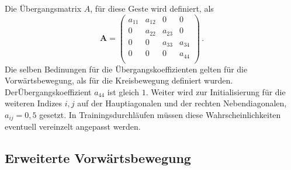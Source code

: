 Die \"Ubergangsmatrix $A$, f\"ur diese Geste wird definiert, als
\begin{equation}
\mathbf{A} = 
\begin{pmatrix}
a_{11} & a_{12} & 0 & 0\\
0 & a_{22} & a_{23} & 0 \\
0 & 0 & a_{33} & a_{34}\\
0 & 0 & 0 & a_{44} \\
\end{pmatrix} \, .
\end{equation}
Die selben Bedinungen f\"ur die \"Ubergangskoeffizienten gelten f\"ur die Vorw\"artsbewegung, als f\"ur die Kreisbewegung definiert wurden. 
\newline
Der\"Ubergangskoeffizient $a_{44}$ ist gleich $1$. Weiter wird zur Initialisierung f\"ur die weiteren Indizes $i, j$ auf der Hauptiagonalen und der rechten Nebendiagonalen, $a_{ij} = 0,5$ gesetzt. In Trainingsdurchl\"aufen m\"ussen diese Wahrscheinlichkeiten eventuell vereinzelt angepasst werden.

\subsection{Erweiterte Vorw\"artsbewegung}

